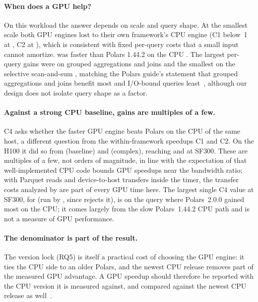 \documentclass[sigconf, nonacm]{acmart}
\begin{document}
\paragraph{When does a GPU help?} On this workload the answer depends on scale
and query shape. At the smallest scale both GPU engines lost to their own
framework's CPU engine (C1 below~1 at , C2 at
), which is consistent with fixed per-query
costs that a small input cannot amortize. \polarsgpu{} was faster than Polars
1.44.2 on the CPU . The largest per-query gains were
on grouped aggregations and joins and the smallest on the selective
scan-and-sum , matching the Polars guide's statement that grouped
aggregations and joins benefit most and I/O-bound queries
least~\citep{polars_gpu_guide}, although our design does not isolate query
shape as a factor.

\paragraph{Against a strong CPU baseline, gains are multiples of a few.} C4
asks whether the faster GPU engine beats Polars on the CPU of the same host, a
different question from the within-framework speedups C1 and C2. On the H100
it did so from  (baseline) and
 (complex), reaching
 and  at SF300. These
are multiples of a few, not orders of magnitude, in line with the expectation
of \citet{shanbhag2020gpucpu} that well-implemented CPU code bounds GPU
speedups near the bandwidth ratio; with Parquet reads and device-to-host
transfers inside the timer, the transfer costs analyzed by
\citet{lutz2020pump} are part of every GPU time here. The largest single C4
value at SF300,  for 
(run by \sparkgpu{}, since \polarsgpu{} rejects it), is on the query where
Polars~2.0.0 gained most on the CPU; it comes largely from the slow
Polars~1.44.2 CPU path and is not a measure of GPU performance.

\paragraph{The denominator is part of the result.} The version lock (RQ5) is
itself a practical cost of choosing the GPU engine: it ties the CPU side to an
older Polars, and the newest CPU release removes part of the measured GPU
advantage. A GPU speedup should therefore be reported with the CPU version it
is measured against, and compared against the newest CPU release as
well~\citep{ejiofor2026lockin}.
\end{document}
